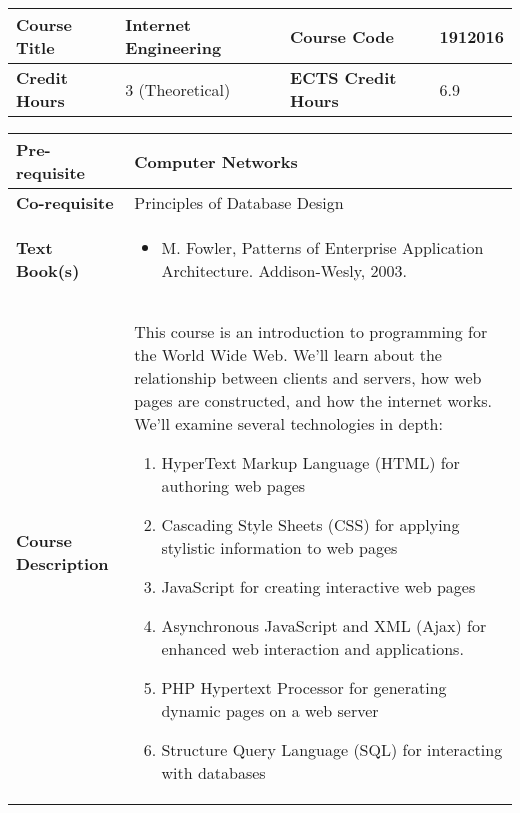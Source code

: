 \documentclass[12pt]{article}
\begin{document}
\begin{minipage}{\textwidth}
\begin{tabularx}{\textwidth}{|l|X|l|X|}
\hline
\textbf{Course Title}       &   Internet Engineering & \textbf{Course Code}       &   1912016\\ \hline
\textbf{Credit Hours}       &   3 (Theoretical) & \textbf{ECTS Credit Hours}       & 6.9  \\ \hline
\end{tabularx}

\begin{tabularx}{\textwidth}{|l|X|}
\hline
\textbf{Pre-requisite}      &  Computer Networks \\ \hline
\textbf{Co-requisite}       &  Principles of Database Design \\ \hline
\textbf{Text Book(s)}      & \begin{minipage}{.70\textwidth}
					\begin{itemize} \itemsep-0.4em
						\vspace{3mm}
						\item M. Fowler, Patterns of Enterprise Application Architecture. Addison-Wesly, 2003.
						\vspace{3mm}
					\end{itemize}
				\end{minipage}  \\ \hline
\textbf{Course Description} & \begin{minipage}{.70\textwidth}
					\vspace{3mm}

					This course is an introduction to programming for the World Wide Web. We’ll learn about the relationship
					between clients and servers, how web pages are constructed, and how the internet works. We’ll examine several
					technologies in depth: 
					\newline
					\begin{enumerate}
					  \item  HyperText Markup Language (HTML) for authoring web pages
					  \item Cascading Style Sheets (CSS) for applying stylistic information to web pages
					  \item  JavaScript for creating interactive web pages
					  \item Asynchronous JavaScript and XML (Ajax) for enhanced web interaction and applications.
					  \item  PHP Hypertext Processor for generating dynamic pages on a web server
					  \item   Structure Query Language (SQL) for interacting with databases
					\end{enumerate}

					\vspace{3mm}
				\end{minipage} \\ \hline
\end{tabularx}
\end{minipage}
\end{document}
